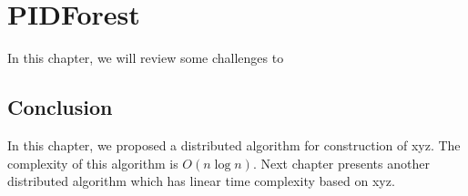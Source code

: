 \chapter{PIDForest}
\label{ch:pidforest}

In this chapter, we will review some challenges to 

\section{Conclusion}
In this chapter, we proposed a distributed algorithm
for construction of xyz.
The complexity of this algorithm is $O(n \log n)$.
Next chapter presents
another distributed algorithm which has linear time 
complexity based on xyz.


